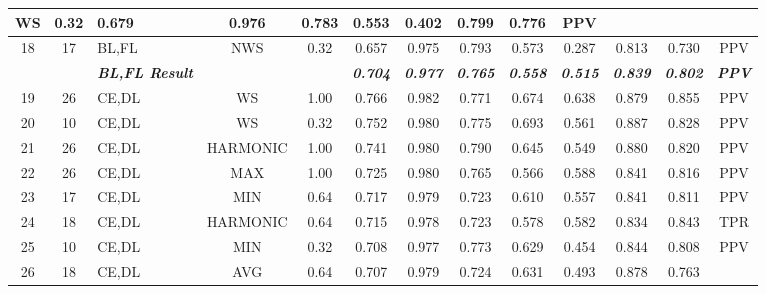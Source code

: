 \begin{table}[H]
{\begin{tabular}{cc|l|cc|c|c|c|c|c|c|c|c|}
    \multicolumn{1}{c|}{WS} &
    0.32 &
    0.679 &
    0.976 &
    0.783 &
    0.553 &
    0.402 &
    0.799 &
    0.776 &
    PPV \\ \hline
  \multicolumn{1}{|c|}{18} &
    17 &
    BL,FL &
    \multicolumn{1}{c|}{NWS} &
    0.32 &
    0.657 &
    0.975 &
    0.793 &
    0.573 &
    0.287 &
    0.813 &
    0.730 &
    PPV \\ \hline
   &
    \textit{\textbf{}} &
    \textit{\textbf{BL,FL Result}} &
     &
     &
    \textit{\textbf{0.704}} &
    \textit{\textbf{0.977}} &
    \textit{\textbf{0.765}} &
    \textit{\textbf{0.558}} &
    \textit{\textbf{0.515}} &
    \textit{\textbf{0.839}} &
    \textit{\textbf{0.802}} &
    \textit{\textbf{PPV}} \\ \hline
    \multicolumn{1}{|c|}{19} &
    26 &
    CE,DL &
    \multicolumn{1}{c|}{WS} &
    1.00 &
    0.766 &
    0.982 &
    0.771 &
    0.674 &
    0.638 &
    0.879 &
    0.855 &
    PPV \\ \hline
  \multicolumn{1}{|c|}{20} &
    10 &
    CE,DL &
    \multicolumn{1}{c|}{WS} &
    0.32 &
    0.752 &
    0.980 &
    0.775 &
    0.693 &
    0.561 &
    0.887 &
    0.828 &
    PPV \\ \hline
  \multicolumn{1}{|c|}{21} &
    26 &
    CE,DL &
    \multicolumn{1}{c|}{HARMONIC} &
    1.00 &
    0.741 &
    0.980 &
    0.790 &
    0.645 &
    0.549 &
    0.880 &
    0.820 &
    PPV \\ \hline
  \multicolumn{1}{|c|}{22} &
    26 &
    CE,DL &
    \multicolumn{1}{c|}{MAX} &
    1.00 &
    0.725 &
    0.980 &
    0.765 &
    0.566 &
    0.588 &
    0.841 &
    0.816 &
    PPV \\ \hline
  \multicolumn{1}{|c|}{23} &
    17 &
    CE,DL &
    \multicolumn{1}{c|}{MIN} &
    0.64 &
    0.717 &
    0.979 &
    0.723 &
    0.610 &
    0.557 &
    0.841 &
    0.811 &
    PPV \\ \hline
  \multicolumn{1}{|c|}{24} &
    18 &
    CE,DL &
    \multicolumn{1}{c|}{HARMONIC} &
    0.64 &
    0.715 &
    0.978 &
    0.723 &
    0.578 &
    0.582 &
    0.834 &
    0.843 &
    TPR \\ \hline
  \multicolumn{1}{|c|}{25} &
    10 &
    CE,DL &
    \multicolumn{1}{c|}{MIN} &
    0.32 &
    0.708 &
    0.977 &
    0.773 &
    0.629 &
    0.454 &
    0.844 &
    0.808 &
    PPV \\ \hline
  \multicolumn{1}{|c|}{26} &
    18 &
    CE,DL &
    \multicolumn{1}{c|}{AVG} &
    0.64 &
    0.707 &
    0.979 &
    0.724 &
    0.631 &
    0.493 &
    0.878 &
    0.763 &

\end{tabular}}
\end{table}
